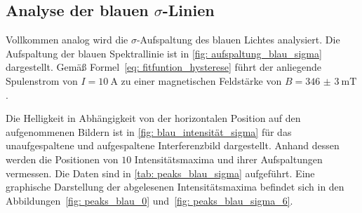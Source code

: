 \subsection{Analyse der blauen $\sigma$-Linien}
Vollkommen analog wird die $\sigma$-Aufspaltung des blauen Lichtes analysiert.
Die Aufspaltung der blauen Spektrallinie ist in \autoref{fig: aufspaltung_blau_sigma} dargestellt.
Gemäß Formel~\eqref{eq: fitfuntion_hysterese}
führt der anliegende Spulenstrom von $I = \SI{10}{\ampere}$ zu einer magnetischen Feldstärke von $B = \SI{346(3)}{\milli\tesla}$.

Die Helligkeit in Abhängigkeit von der horizontalen Position auf den aufgenommenen Bildern ist in \autoref{fig: blau_intensität_sigma} für das unaufgespaltene
und aufgespaltene Interferenzbild dargestellt. Anhand dessen werden die Positionen von $10$ Intensitätsmaxima und ihrer Aufspaltungen
vermessen. Die Daten sind in \autoref{tab: peaks_blau_sigma} aufgeführt.
Eine graphische Darstellung der abgelesenen Intensitätsmaxima befindet sich in den Abbildungen~\ref{fig: peaks_blau_0}
und~\ref{fig: peaks_blau_sigma_6}.

